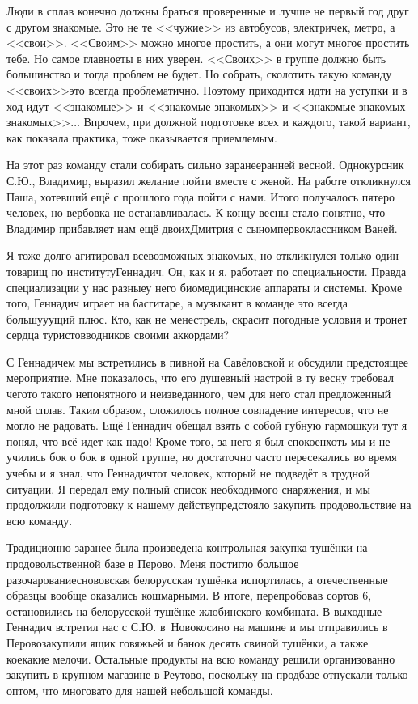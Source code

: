 Люди в сплав конечно должны браться проверенные и лучше не первый год друг с другом знакомые. Это не те <<чужие>> из автобусов, электричек, метро, а <<свои>>. <<Своим>> можно многое простить, а они могут многое простить тебе. Но самое главное\mdash ты в них уверен. <<Своих>> в группе должно быть большинство и тогда проблем не будет. Но собрать, сколотить такую команду <<своих>>\mdash это всегда проблематично. Поэтому приходится идти на уступки и в ход идут <<знакомые>> и <<знакомые знакомых>> и <<знакомые знакомых знакомых>>$\ldots$ Впрочем, при должной подготовке всех и каждого, такой вариант, как показала практика, тоже оказывается приемлемым.

На этот раз команду стали собирать сильно заранее\mdash ранней весной. Однокурсник С.Ю., Владимир, выразил желание пойти вместе с женой. На работе откликнулся Паша, хотевший ещё с прошлого года пойти с нами. Итого получалось пятеро человек, но вербовка не останавливалась. К концу весны стало понятно, что Владимир прибавляет нам ещё двоих\mdash Дмитрия с сыном\sdash первоклассником Ваней. 

Я тоже долго агитировал всевозможных знакомых, но откликнулся только один товарищ по институту\mdash Геннадич. Он, как и я, работает по специальности. Правда специализации у нас разные\mdash у него биомедицинские аппараты и системы. Кроме того, Геннадич играет на бас\sdash гитаре, а музыкант в команде это всегда большу\sdash у\sdash ущий плюс. Кто, как не менестрель, скрасит погодные условия и тронет сердца туристов\sdash водников своими аккордами?

С Геннадичем мы встретились в пивной на Савёловской и обсудили предстоящее мероприятие. Мне показалось, что его душевный настрой в ту весну требовал чего\sdash то такого непонятного и неизведанного, чем для него стал предложенный мной сплав. Таким образом, сложилось полное совпадение интересов, что не могло не радовать. Ещё Геннадич обещал взять с собой губную гармошку\mdash и тут я понял, что всё идет как надо! Кроме того, за него я был спокоен\mdash хоть мы и не учились бок о бок в одной группе, но достаточно часто пересекались во время учебы и я знал, что Геннадич\mdash тот человек, который не подведёт в трудной ситуации. Я передал ему полный список необходимого снаряжения, и мы продолжили подготовку к нашему действу\mdash предстояло закупить продовольствие на всю команду.

Традиционно заранее была произведена контрольная закупка тушёнки на продовольственной базе в Перово. Меня постигло большое разочарование\mdash снововская белорусская тушёнка испортилась, а отечественные образцы вообще оказались кошмарными. В итоге, перепробовав сортов 6\thinspace\nbdash{}, остановились на белорусской тушёнке жлобинского комбината. В выходные Геннадич встретил нас с С.Ю. в~Новокосино на машине и мы отправились в Перово\mdash закупили ящик говяжьей и банок десять свиной тушёнки, а также кое\sdash какие мелочи. Остальные продукты на всю команду решили организованно закупить в крупном магазине в Реутово, поскольку на продбазе отпускали только оптом, что многовато для нашей небольшой команды.  

